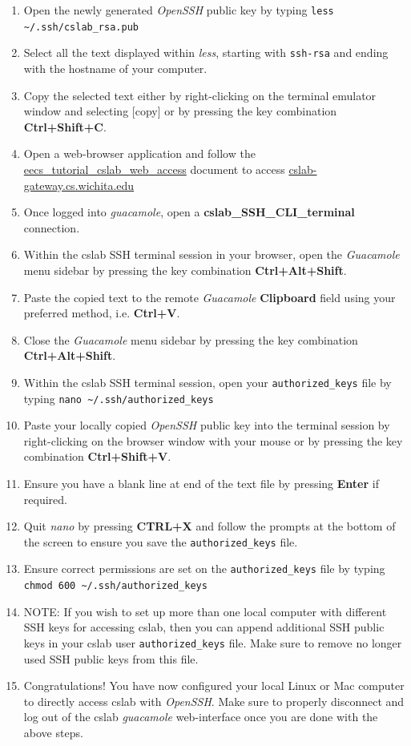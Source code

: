 \documentclass[12pt]{article}
\begin{document}
\begin{flushleft}
\begin{enumerate}
  \item Open the newly generated \textit{OpenSSH} public key by typing \break
    \verb|less ~/.ssh/cslab_rsa.pub|
  \item Select all the text displayed within \textit{less}, starting with \texttt{ssh-rsa} and ending with the hostname of your computer.
  \item Copy the selected text either by right-clicking on the terminal emulator window and selecting [copy] or by pressing the key combination \textbf{Ctrl+Shift+C}.
  \item Open a web-browser application and follow the \href{https://github.com/benroose/tutorials/blob/master/cslab_tutorials/eecs_tutorial_cslab_web_access.pdf}{eecs\_tutorial\_cslab\_web\_access} document to access \href{https://cslab-gateway.cs.wichita.edu/}{cslab-gateway.cs.wichita.edu}
  \item Once logged into \textit{guacamole}, open a \textbf{cslab\_SSH\_CLI\_terminal} connection.
  \item Within the cslab SSH terminal session in your browser, open the \textit{Guacamole} menu sidebar by pressing the key combination \textbf{Ctrl+Alt+Shift}.
  \item Paste the copied text to the remote \textit{Guacamole} \textbf{Clipboard} field using your preferred method, i.e. \textbf{Ctrl+V}.
  \item Close the \textit{Guacamole} menu sidebar by pressing the key combination \textbf{Ctrl+Alt+Shift}.
  \item Within the cslab SSH terminal session, open your \texttt{authorized\_keys} file by typing \break
  \verb|nano ~/.ssh/authorized_keys|
  \item Paste your locally copied \textit{OpenSSH} public key into the terminal session by right-clicking on the browser window with your mouse or by pressing the key combination \textbf{Ctrl+Shift+V}.
  \item Ensure you have a blank line at end of the text file by pressing \textbf{Enter} if required.
  \item Quit \textit{nano} by pressing \textbf{CTRL+X} and follow the prompts at the bottom of the screen to ensure you save the \verb|authorized_keys| file.
  \item Ensure correct permissions are set on the \verb|authorized_keys| file by typing \break
    \verb|chmod 600 ~/.ssh/authorized_keys|
  \item NOTE: If you wish to set up more than one local computer with different SSH keys for accessing cslab, then you can append additional SSH public keys in your cslab user \verb|authorized_keys| file. Make sure to remove no longer used SSH public keys from this file.
  \item Congratulations! You have now configured your local Linux or Mac computer to directly access cslab with \textit{OpenSSH}. Make sure to properly disconnect and log out of the cslab \textit{guacamole} web-interface once you are done with the above steps.
\end{enumerate}


\end{flushleft}
\end{document}
